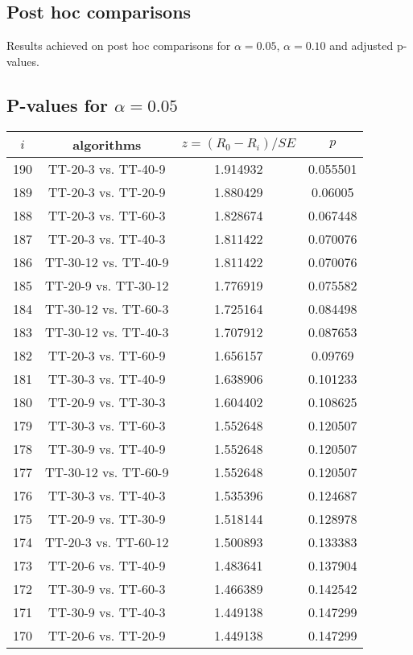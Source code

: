 \documentclass[a4paper,10pt]{article}
\begin{document}
\begin{landscape}
\pagebreak

\section{Post hoc comparisons}

Results achieved on post hoc comparisons for $\alpha = 0.05$, $\alpha = 0.10$ and adjusted p-values.

\subsection{P-values for $\alpha=0.05$}

\begin{table}[!htp]
\centering\scriptsize
\begin{tabular}{cccc}
$i$&algorithms&$z=(R_0 - R_i)/SE$&$p$\\
\hline190&TT-20-3 vs. TT-40-9&1.914932&0.055501\\
189&TT-20-3 vs. TT-20-9&1.880429&0.06005\\
188&TT-20-3 vs. TT-60-3&1.828674&0.067448\\
187&TT-20-3 vs. TT-40-3&1.811422&0.070076\\
186&TT-30-12 vs. TT-40-9&1.811422&0.070076\\
185&TT-20-9 vs. TT-30-12&1.776919&0.075582\\
184&TT-30-12 vs. TT-60-3&1.725164&0.084498\\
183&TT-30-12 vs. TT-40-3&1.707912&0.087653\\
182&TT-20-3 vs. TT-60-9&1.656157&0.09769\\
181&TT-30-3 vs. TT-40-9&1.638906&0.101233\\
180&TT-20-9 vs. TT-30-3&1.604402&0.108625\\
179&TT-30-3 vs. TT-60-3&1.552648&0.120507\\
178&TT-30-9 vs. TT-40-9&1.552648&0.120507\\
177&TT-30-12 vs. TT-60-9&1.552648&0.120507\\
176&TT-30-3 vs. TT-40-3&1.535396&0.124687\\
175&TT-20-9 vs. TT-30-9&1.518144&0.128978\\
174&TT-20-3 vs. TT-60-12&1.500893&0.133383\\
173&TT-20-6 vs. TT-40-9&1.483641&0.137904\\
172&TT-30-9 vs. TT-60-3&1.466389&0.142542\\
171&TT-30-9 vs. TT-40-3&1.449138&0.147299\\
170&TT-20-6 vs. TT-20-9&1.449138&0.147299\\

\end{tabular}
\end{table}
\end{landscape}
\end{document}
